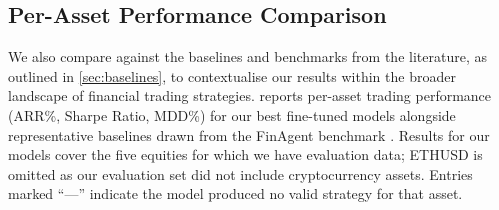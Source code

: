 \documentclass[12pt, a4paper]{report}
\begin{document}
\begin{table}[htbp]
  \centering
  \caption{Strategy generation performance of fine-tuned vs.\ base models. }
  \label{tab:model-comparison}
\end{table}


\subsection{Per-Asset Performance Comparison}

We also compare against the baselines and benchmarks from the literature, as outlined in \cref{sec:baselines}, 
to contextualise our results within the broader landscape of financial trading strategies.
 reports per-asset trading performance (ARR\%, Sharpe Ratio, MDD\%)
for our best fine-tuned models alongside representative baselines drawn from the FinAgent
benchmark \cite{zhang2024finagent}.
Results for our models cover the five equities for which we have evaluation data; ETHUSD is
omitted as our evaluation set did not include cryptocurrency assets.
Entries marked ``—'' indicate the model produced no valid strategy for that asset.
\end{document}
